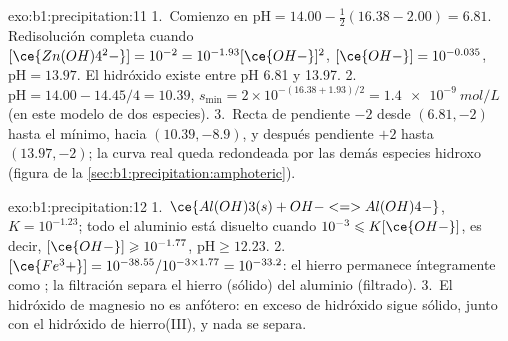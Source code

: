 \begin{solution}{exo:b1:precipitation:11}
1.~Comienzo en $\mathrm{pH} = 14.00 - \frac12(16.38 - 2.00) = 6.81$.
Redisolución completa cuando $[\ce{Zn(OH)4^2-}] = 10^{-2} = 10^{-1.93}[\ce{OH-}]^2$,
$[\ce{OH-}] = 10^{-0.035}$, $\mathrm{pH} = 13.97$. El hidróxido existe
entre pH 6.81 y 13.97.
2.~$\mathrm{pH} = 14.00 - 14.45/4 = 10.39$, $s_{\min} = 2 \times
10^{-(16.38 + 1.93)/2} = \qty{1.4e-9}{mol/L}$ (en este modelo de dos
especies).
3.~Recta de pendiente $-2$ desde $(6.81, -2)$ hasta el mínimo, hacia
$(10.39, -8.9)$, y después pendiente $+2$ hasta $(13.97, -2)$; la curva
real queda redondeada por las demás especies hidroxo
(figura de la \cref{sec:b1:precipitation:amphoteric}).
\end{solution}

\begin{solution}{exo:b1:precipitation:12}
1.~$\ce{Al(OH)3(s) + OH- <=> Al(OH)4-}$, $K = 10^{-1.23}$; todo el
aluminio está disuelto cuando $10^{-3} \leqslant K[\ce{OH-}]$, es decir,
$[\ce{OH-}] \geqslant 10^{-1.77}$, $\mathrm{pH} \geqslant 12.23$.
2.~$[\ce{Fe^3+}] = 10^{-38.55}/10^{-3 \times 1.77} = 10^{-33.2}$: el
hierro permanece íntegramente como ; la filtración separa el
hierro (sólido) del aluminio (filtrado).
3.~El hidróxido de magnesio no es anfótero: en exceso de hidróxido sigue
sólido, junto con el hidróxido de hierro(III), y nada se separa.
\end{solution}

